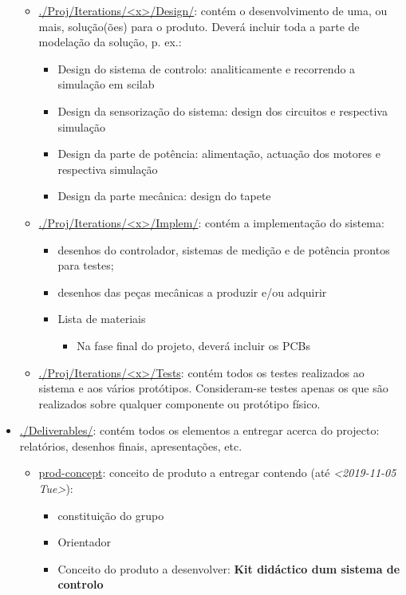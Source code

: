 \documentclass[11pt]{article}
\begin{document}
\begin{itemize}
\begin{itemize}
\begin{itemize}
\end{itemize}
\item \href{Design}{./Proj/Iterations/<x>/Design/}: contém o desenvolvimento de uma, ou mais,
solução(ões) para o produto. Deverá incluir toda a parte de modelação da solução, p. ex.:
\begin{itemize}
\item Design do sistema de controlo: analiticamente e recorrendo a simulação em
scilab
\item Design da sensorização do sistema: design dos circuitos e respectiva
simulação
\item Design da parte de potência: alimentação, actuação dos motores e respectiva
simulação
\item Design da parte mecânica: design do tapete
\end{itemize}
\item \href{Implem}{./Proj/Iterations/<x>/Implem/}: contém a implementação do sistema: 
\begin{itemize}
\item desenhos do controlador, sistemas de medição e de potência prontos para
testes;
\item desenhos das peças mecânicas a produzir e/ou adquirir
\item Lista de materiais
\begin{itemize}
\item Na fase final do projeto, deverá incluir os PCBs
\end{itemize}
\end{itemize}
\item \href{Testes}{./Proj/Iterations/<x>/Tests}: contém todos os testes realizados ao sistema e
aos vários protótipos. Consideram-se testes apenas os que são realizados
sobre qualquer componente ou protótipo físico.
\end{itemize}
\item \href{Deliverables}{./Deliverables/}: contém todos os elementos a entregar acerca do projecto:
relatórios, desenhos finais, apresentações, etc.
\begin{itemize}
\item \href{Deliverables/prod-concept.org}{prod-concept}: conceito de produto a entregar contendo (até
\textit{<2019-11-05 Tue>}):
\begin{itemize}
\item constituição do grupo
\item Orientador
\item Conceito do produto a desenvolver: \textbf{Kit didáctico dum sistema de controlo
}
\end{itemize}
\end{itemize}
\end{itemize}
\end{document}
